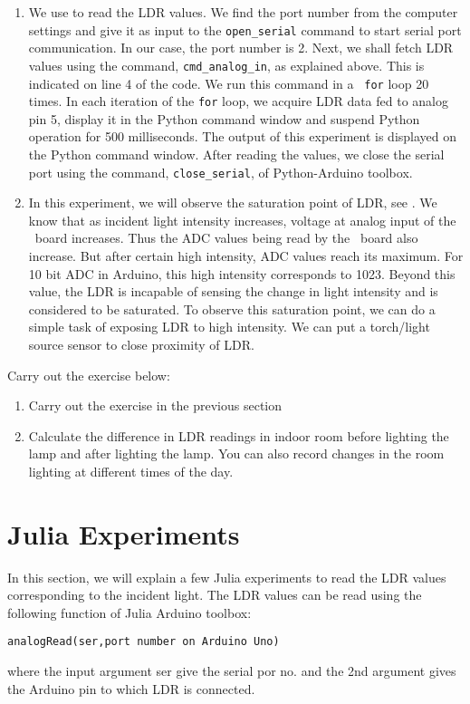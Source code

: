 \begin{enumerate}
\item We use  to read the LDR values.  We find the
  port number from the computer settings and give it as input to the
  {\tt open\_serial} command to start serial port communication. In
  our case, the port number is 2. Next, we shall fetch LDR values
  using the command, {\tt cmd\_analog\_in}, as explained above. This
  is indicated on line 4 of the code. We run this command in a {\tt
    for} loop 20 times. In each iteration of the {\tt for} loop, we
  acquire LDR data fed to analog pin 5, display it in the Python
  command window and suspend Python operation for 500
  milliseconds. The output of this experiment is displayed on the Python command
  window. After reading the values, we close the serial port using the
  command, {\tt close\_serial}, of Python-Arduino toolbox.

\item In this experiment, we will observe the saturation point of LDR,
  see .  We know that as incident light intensity
  increases, voltage at analog input of the \arduino\ board
  increases. Thus the ADC values being read by the \arduino\ board also
  increase. But after certain high intensity, ADC values reach its
  maximum. For 10 bit ADC in Arduino, this high intensity corresponds
  to 1023.  Beyond this value, the LDR is incapable of sensing the
  change in light intensity and is considered to be saturated. To
  observe this saturation point, we can do a simple task of exposing
  LDR to high intensity. We can put a torch/light source sensor to
  close proximity of LDR.
\end{enumerate}

\begin{exercise}
Carry out the exercise below:
\begin{enumerate}
\item Carry out the exercise in the previous section
\item Calculate the difference in LDR readings in indoor room
  before lighting the lamp and after lighting the lamp. You can also
  record changes in the room lighting at different times of the day.
\end{enumerate}
\end{exercise}


\section {Julia Experiments}
In this section, we will explain a few Julia experiments to read the
LDR values corresponding to the incident light. The LDR values can be
read using the following function of Julia Arduino toolbox:
\begin{lstlisting}[style=nonumbers]
  analogRead(ser,port number on Arduino Uno)
\end{lstlisting}
where the input argument ser give the serial por no. and the 2nd argument gives the Arduino pin to which 
LDR is connected.

